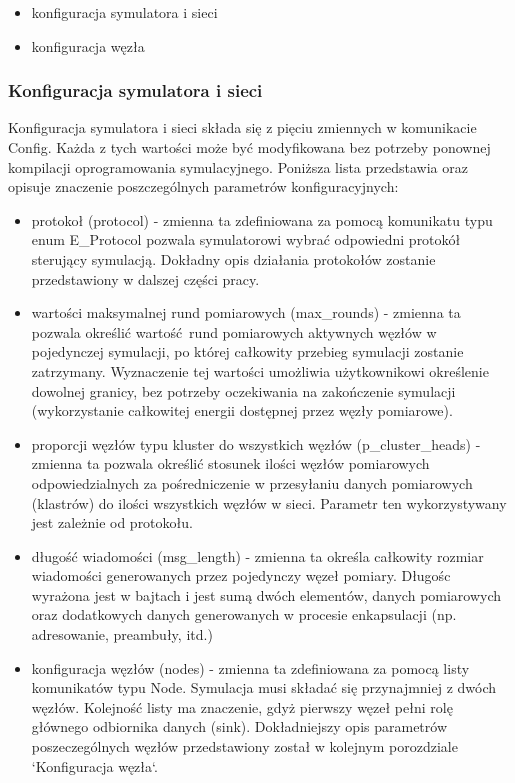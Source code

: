 \documentclass[a4paper,12pt,twoside,openany]{report}
\begin{document}
\begin{itemize}
 \item konfiguracja symulatora i sieci
 \item konfiguracja węzła
\end{itemize}

\subsubsection{Konfiguracja symulatora i sieci}

Konfiguracja symulatora i sieci składa się z pięciu zmiennych w komunikacie Config. Każda z tych wartości może być modyfikowana bez potrzeby
ponownej kompilacji oprogramowania symulacyjnego. Poniższa lista przedstawia oraz opisuje znaczenie poszczególnych parametrów konfiguracyjnych:

\begin{itemize}
 \item protokoł (protocol) - zmienna ta zdefiniowana za pomocą komunikatu typu enum E\_Protocol pozwala symulatorowi wybrać odpowiedni 
       protokół sterujący symulacją. Dokładny opis działania protokołów zostanie przedstawiony w dalszej części pracy.
 \item wartości maksymalnej rund pomiarowych (max\_rounds) - zmienna ta pozwala określić wartość rund pomiarowych aktywnych węzłów w pojedynczej symulacji, 
       po której całkowity przebieg symulacji zostanie zatrzymany.
       Wyznaczenie tej wartości umożliwia użytkownikowi określenie dowolnej granicy, bez potrzeby oczekiwania na zakończenie symulacji (wykorzystanie 
       całkowitej energii dostępnej przez węzły pomiarowe).
 \item proporcji węzłów typu kluster do wszystkich węzłów (p\_cluster\_heads) - zmienna ta pozwala określić stosunek ilości węzłów pomiarowych 
       odpowiedzialnych za pośredniczenie w przesyłaniu danych pomiarowych (klastrów) do ilości wszystkich węzłów w sieci. Parametr ten wykorzystywany jest
       zależnie od protokołu.
 \item długość wiadomości (msg\_length) - zmienna ta określa całkowity rozmiar wiadomości generowanych przez pojedynczy węzeł pomiary.
       Długośc wyrażona jest w bajtach i jest sumą dwóch elementów, danych pomiarowych oraz dodatkowych danych generowanych w procesie enkapsulacji
       (np. adresowanie, preambuły, itd.)
 \item konfiguracja węzłów (nodes) - zmienna ta zdefiniowana za pomocą listy komunikatów typu Node. Symulacja musi składać się przynajmniej z dwóch węzłów.
       Kolejność listy ma znaczenie, gdyż pierwszy węzeł pełni rolę głównego odbiornika danych (sink).
       Dokładniejszy opis parametrów poszeczególnych węzłów przedstawiony został w kolejnym porozdziale `Konfiguracja węzła`. 
\end{itemize}
\end{document}
